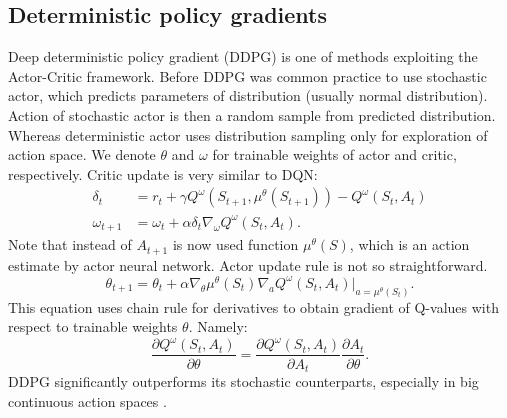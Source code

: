 \subsection{Deterministic policy gradients}
Deep deterministic policy gradient (DDPG) is one of methods exploiting the Actor-Critic framework. Before DDPG was common practice to use stochastic actor, which predicts parameters of distribution (usually normal distribution). Action of stochastic actor is then a random sample from predicted distribution. Whereas deterministic actor uses distribution sampling only for exploration of action space. We denote $\theta$ and $\omega$ for trainable weights of actor and critic, respectively. Critic update is very similar to DQN:
\begin{align}
\delta_t &= r_t + \gamma Q^\omega(S_{t+1}, \mu ^\theta (S_{t+1})) - Q^\omega(S_t, A_t)\\
\omega_{t+1} &= \omega_t + \alpha \delta_t \nabla_\omega Q^\omega(S_t, A_t).
\end{align}
Note that instead of $A_{t+1}$ is now used function $\mu^\theta(S)$, which is an action estimate by actor neural network. Actor update rule is not so straightforward. 
\begin{equation}
\theta_{t+1} = \theta_t + \alpha\nabla_\theta \mu^\theta(S_t)\nabla_a Q^\omega (S_t, A_t)|_{a = \mu^\theta(S_t)}.
\end{equation}
This equation uses chain rule for derivatives to obtain gradient of Q-values with respect to trainable weights $\theta$. Namely:
\begin{equation}
\frac{\partial Q^\omega(S_t, A_t)}{\partial \theta} = \frac{\partial Q^\omega(S_t, A_t)}{\partial A_t} \frac{\partial A_t}{\partial \theta}.
\end{equation}
DDPG significantly outperforms its stochastic counterparts, especially in big continuous action spaces \cite{silver2014}.


